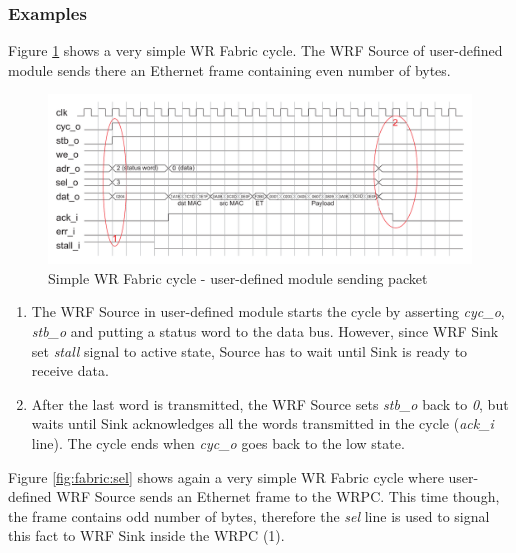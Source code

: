 \subsubsection{Examples}
Figure \ref{fig:fabric:simple_tx} shows a very simple WR Fabric cycle. The WRF
Source of user-defined module sends there an Ethernet frame containing even
number of bytes.

\begin{figure}
  \begin{center}
    \includegraphics[width=\textwidth]{fig/basic_wrf_cycle_simple.pdf}
    \caption{Simple WR Fabric cycle - user-defined module sending packet}
    \label{fig:fabric:simple_tx}
  \end{center}
\end{figure}

\begin{enumerate}
  \item The WRF Source in user-defined module starts the cycle by asserting
    \emph{cyc\_o}, \emph{stb\_o} and putting a status word to the data bus.
    However, since WRF Sink set \emph{stall} signal to active state, Source has
    to wait until Sink is ready to receive data.
  \item After the last word is transmitted, the WRF Source sets \emph{stb\_o} back
    to \emph{0}, but waits until Sink acknowledges all the words transmitted in
    the cycle (\emph{ack\_i} line). The cycle ends when \emph{cyc\_o} goes back
    to the low state.
\end{enumerate}

Figure \ref{fig:fabric:sel} shows again a very simple WR Fabric cycle where
user-defined WRF Source sends an Ethernet frame to the WRPC. This time though,
the frame contains odd number of bytes, therefore the \emph{sel} line is used to
signal this fact to WRF Sink inside the WRPC (1).

